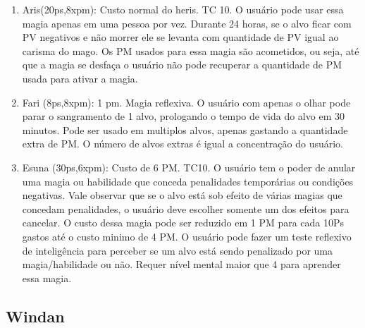\begin{enumerate}
	\item Aris(20ps,8xpm): Custo normal do heris. TC 10.\newline
O usuário pode usar essa magia apenas em uma pessoa por vez. Durante 24 horas, se o alvo ficar com PV negativos e não morrer ele se levanta com quantidade de PV igual ao carisma do mago. Os PM usados para essa magia são acometidos, ou seja, até que a magia se desfaça o usuário não pode recuperar a quantidade de PM usada para ativar a magia.

	\item Fari (8ps,8xpm): 1 pm. Magia reflexiva.\newline
O usuário com apenas o olhar pode parar o sangramento de 1 alvo, prologando o tempo de vida do alvo em 30 minutos. Pode ser usado em multiplos alvos, apenas gastando a quantidade extra de PM. O número de alvos extras é igual a concentração do usuário.

	\item Esuna (30ps,6xpm): Custo de 6 PM. TC10.\newline
O usuário tem o poder de anular uma magia ou habilidade que conceda penalidades temporárias ou condições negativas. Vale observar que se o alvo está sob efeito de várias magias que concedam penalidades, o usuário deve escolher somente um dos efeitos para cancelar. O custo dessa magia pode ser reduzido em 1 PM para cada 10Ps gastos até o custo minimo de 4 PM. O usuário pode fazer um teste reflexivo de inteligência para perceber se um alvo está sendo penalizado por uma magia/habilidade ou não. Requer nível mental maior que 4 para aprender essa magia.

\end{enumerate}

\subsection{Windan}

